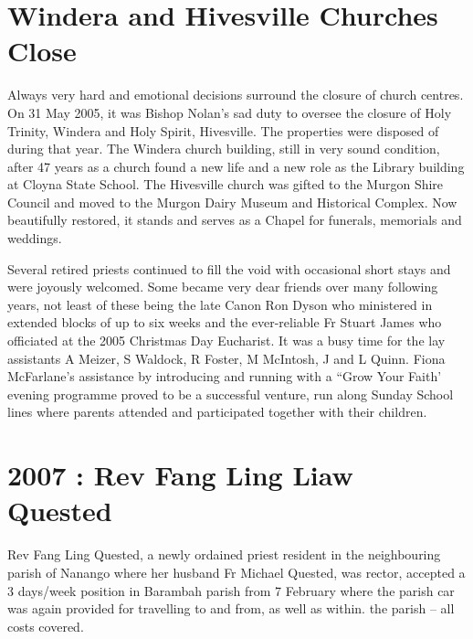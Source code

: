 \hypertarget{windera-and-hivesville-churches-close}{%
\section{Windera and Hivesville Churches Close}\label{windera-and-hivesville-churches-close}}

Always very hard and emotional decisions surround the closure of church centres. On 31 May 2005, it was Bishop Nolan's sad duty to oversee the closure of Holy Trinity, Windera and Holy Spirit, Hivesville. The properties were disposed of during that year. The Windera church building, still in very sound condition, after 47 years as a church found a new life and a new role as the Library building at Cloyna State School. The Hivesville church was gifted to the Murgon Shire Council and moved to the Murgon Dairy Museum and Historical Complex. Now beautifully restored, it stands and serves as a Chapel for funerals, memorials and weddings.

Several retired priests continued to fill the void with occasional short stays and were joyously welcomed. Some became very dear friends over many following years, not least of these being the late Canon Ron Dyson who ministered in extended blocks of up to six weeks and the ever-reliable Fr Stuart James who officiated at the 2005 Christmas Day Eucharist. It was a busy time for the lay assistants A Meizer, S Waldock, R Foster, M McIntosh, J and L Quinn. Fiona McFarlane's assistance by introducing and running with a ``Grow Your Faith' evening programme proved to be a successful venture, run along Sunday School lines where parents attended and participated together with their children.

\hypertarget{rev-fang-ling-liaw-quested}{%
\section{2007 : Rev Fang Ling Liaw Quested}\label{rev-fang-ling-liaw-quested}}

Rev Fang Ling Quested, a newly ordained priest resident in the neighbouring parish of Nanango where her husband Fr Michael Quested, was rector, accepted a 3 days/week position in Barambah parish from 7 February where the parish car was again provided for travelling to and from, as well as within. the parish -- all costs covered.

